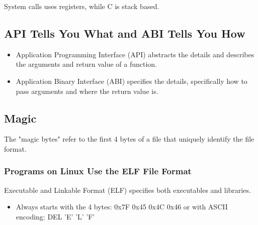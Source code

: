 \begin{warning}
    System calls uses registers, while C is stack based.
\end{warning}

\subsection{API Tells You What and ABI Tells You How}
\begin{definition}
    \begin{itemize}
        \item Application Programming Interface (API) abstracts the details and describes the arguments and return value of a function.
        \item Application Binary Interface (ABI) specifies the details, specifically how to pass arguments and where the return value is.
    \end{itemize}
\end{definition}

\subsection{Magic}
\begin{definition}
    The "magic bytes" refer to the first 4 bytes of a file that uniquely identify the file format. 
\end{definition}

\subsubsection{Programs on Linux Use the ELF File Format}
\begin{definition}
    Executable and Linkable Format (ELF) specifies both executables and libraries.
    \begin{itemize}
        \item Always starts with the 4 bytes: 0x7F 0x45 0x4C 0x46 or with ASCII encoding: DEL 'E' 'L' 'F'
    \end{itemize}
\end{definition}

